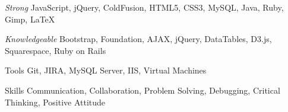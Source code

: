 
\begin{cvskills}

  \cvskill
    {\textit{Strong}} %
    {JavaScript, jQuery, ColdFusion, HTML5, CSS3, MySQL, Java, Ruby, Gimp, LaTeX} %


  \cvskill
    {\textit{Knowledgeable}} %
    {Bootstrap, Foundation, AJAX, jQuery, DataTables, D3.js, Squarespace, Ruby on Rails} %

  \cvskill
    {Tools} %
    {Git, JIRA, MySQL Server, IIS, Virtual Machines} %

  \cvskill
    {Skills} %
    {Communication, Collaboration, Problem Solving, Debugging, Critical Thinking, Positive Attitude} %

\end{cvskills}
